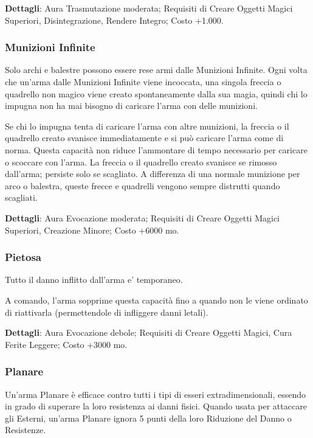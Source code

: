 \begin{multicols}{2}
\textbf{Dettagli}: Aura Trasmutazione moderata; Requisiti di Creare Oggetti Magici Superiori, Disintegrazione, Rendere Integro; Costo +1.000.

\subsubsection{Munizioni Infinite}

Solo archi e balestre possono essere rese armi dalle Munizioni Infinite. Ogni volta che un'arma dalle Munizioni Infinite viene incoccata, una singola freccia o quadrello non magico viene creato spontaneamente dalla sua magia, quindi chi lo impugna non ha mai bisogno di caricare l'arma con delle munizioni.

Se chi lo impugna tenta di caricare l'arma con altre munizioni, la freccia o il quadrello creato svanisce immediatamente e si può caricare l'arma come di norma. Questa capacità non riduce l'ammontare di tempo necessario per caricare o scoccare con l'arma. La freccia o il quadrello creato svanisce se rimosso dall'arma; persiste solo se scagliato. A differenza di una normale munizione per arco o balestra, queste frecce e quadrelli vengono sempre distrutti quando scagliati.

\textbf{Dettagli}: Aura Evocazione moderata; Requisiti di Creare Oggetti Magici Superiori, Creazione Minore; Costo +6000 mo.

\subsubsection{Pietosa}

Tutto il danno inflitto dall'arma e' temporaneo.

A comando, l'arma sopprime questa capacità fino a quando non le viene ordinato di riattivarla (permettendole di infliggere danni letali).

\textbf{Dettagli}: Aura Evocazione debole; Requisiti di Creare Oggetti Magici, Cura Ferite Leggere; Costo +3000 mo.

\subsubsection{Planare}

Un'arma Planare è efficace contro tutti i tipi di esseri extradimensionali, essendo in grado di superare la loro resistenza ai danni fisici. Quando usata per attaccare gli Esterni, un'arma Planare ignora 5 punti della loro Riduzione del Danno o Resistenze.


\end{multicols}
